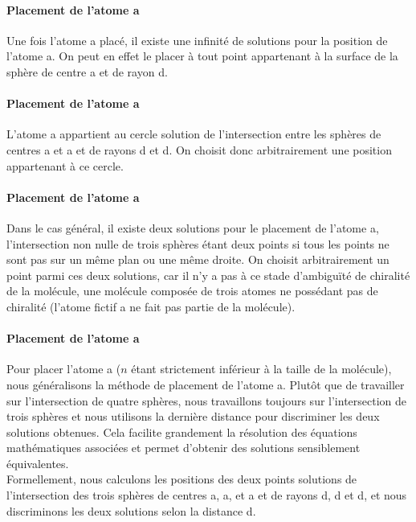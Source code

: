 \paragraph{Placement de l'atome a} Une fois l'atome a placé, il existe une infinité de solutions pour la position de l'atome a. On peut en effet le placer à tout point appartenant à la surface de la sphère de centre a et de rayon d.



\paragraph{Placement de l'atome a} L'atome a appartient au cercle solution de l'intersection entre les sphères de centres a et a et de rayons d et d. On choisit donc arbitrairement une position appartenant à ce cercle.



\paragraph{Placement de l'atome a} Dans le cas général, il existe deux solutions pour le placement de l'atome a, l'intersection non nulle de trois sphères étant deux points si tous les points ne sont pas sur un même plan ou une même droite. On choisit arbitrairement un point parmi ces deux solutions, car il n'y a pas à ce stade d'ambiguïté de chiralité de la molécule, une molécule composée de trois atomes ne possédant pas de chiralité (l'atome fictif a ne fait pas partie de la molécule).


\paragraph{Placement de l'atome a} Pour placer l'atome a ($n$ étant strictement inférieur à la taille de la molécule), nous généralisons la méthode de placement de l'atome a. Plutôt que de travailler sur l'intersection de quatre sphères, nous travaillons toujours sur l'intersection de trois sphères et nous utilisons la dernière distance pour discriminer les deux solutions obtenues. Cela facilite grandement la résolution des équations mathématiques associées et permet d'obtenir des solutions sensiblement équivalentes. \\
Formellement, nous calculons les positions des deux points solutions de l'intersection des trois sphères de centres a, a, et a et de rayons d, d et d, et nous discriminons les deux solutions selon la distance d. 

